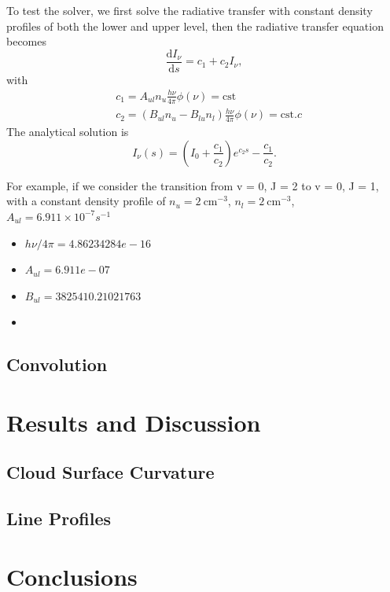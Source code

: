 \documentclass[12pt,a4paper]{article}
\newcommand{\mr}{\mathrm}
\newcommand{\fird}[2][]{\frac{\mathrm{d}#1}{\mathrm{d}#2}}
\begin{document}
To test the solver, we first solve the radiative transfer with constant density profiles of both the lower and upper level, then the radiative transfer equation becomes
\begin{equation}
    \fird[I_\nu]{s} = c_1  + c_2 I_\nu, \label{eq:simple_rte}
\end{equation} 
with 
\begin{align*}
    &c_1 = A_{ul} n_u \frac{h\nu}{4\pi} \phi(\nu) = \mr{cst}\\
    &c_2 = \left(B_{ul} n_u - B_{lu} n_l\right) \frac{h\nu}{4\pi} \phi(\nu) = \mr{cst}.c
\end{align*}
The analytical solution is 
\begin{equation}
    I_\nu (s) = (I_0 + \frac{c_1}{c_2})e^{c_2s} - \frac{c_1}{c_2}.
\end{equation}

For example, if we consider the  transition from v = 0, J = 2 to v = 0, J = 1, with a constant density profile of $n_u = \qty{2}{\cm^{-3}}$, $n_l = \qty{2}{\cm^{-3}}$, $A_{ul} = 6.911 \times 10^{-7} s^{-1}$
\begin{itemize}
    \item $h\nu/4\pi = 4.86234284e-16 $
    \item $A_{ul} = 6.911e-07$
    \item $B_{ul} = 3825410.21021763$
    \item 
\end{itemize}

\subsection{Convolution}

\section{Results and Discussion}
\subsection{Cloud Surface Curvature}
\subsection{Line Profiles}

\section{Conclusions}

\newpage
\printbibliography

\newpage
\appendix
\end{document}
